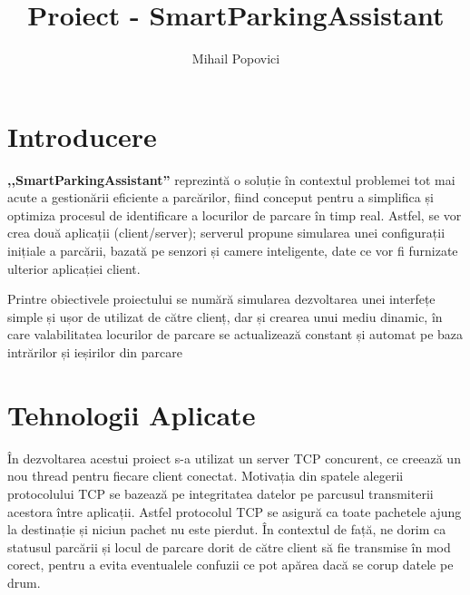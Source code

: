 \documentclass[runningheads]{llncs}
\title{Proiect - SmartParkingAssistant}
\author{Mihail Popovici}
\date{} %
\institute{Facultate de Informatică, Universitatea ,,Alexandru Ioan Cuza” din Iași}
\begin{document}
\maketitle

\section{Introducere}
\textbf{,,SmartParkingAssistant”} reprezintă o soluție în contextul problemei tot mai acute a gestionării eficiente a parcărilor, fiind conceput pentru a simplifica și optimiza procesul de identificare a locurilor de parcare în timp real. Astfel, se vor crea două aplicații (client/server); serverul propune simularea unei configurații inițiale a parcării, bazată pe senzori și camere inteligente, date ce vor fi furnizate ulterior aplicației client. 
\par Printre obiectivele proiectului se numără simularea dezvoltarea unei interfețe simple și ușor de utilizat de către clienț, dar și crearea unui mediu dinamic, în care valabilitatea locurilor de parcare se actualizează constant și automat pe baza intrărilor și ieșirilor din parcare

\section{Tehnologii Aplicate}
În dezvoltarea acestui proiect s-a utilizat un server TCP concurent, ce creează un nou thread pentru fiecare client conectat. Motivația din spatele alegerii protocolului TCP se bazează pe integritatea datelor pe parcusul transmiterii acestora între aplicații. Astfel protocolul TCP se asigură ca toate pachetele ajung la destinație și niciun pachet nu este pierdut. În contextul de față, ne dorim ca statusul parcării și locul de parcare dorit de către client să fie transmise în mod corect, pentru a evita eventualele confuzii ce pot apărea dacă se corup datele pe drum. 
\end{document}
